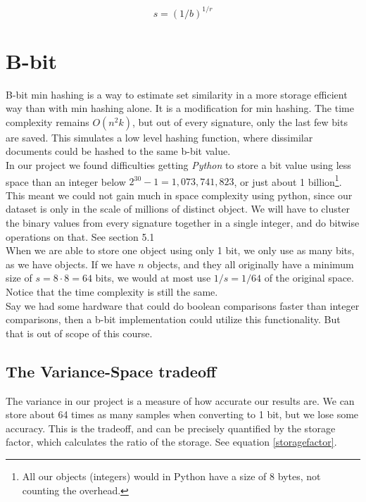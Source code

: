 \documentclass[a4paper,11pt]{article}
\begin{document}
\begin{equation}
    s = (1/b)^{1/r}
    \label{eq:s-estimate}
\end{equation}


\section{B-bit}
B-bit min hashing is a way to estimate set similarity in a more storage efficient way than with min hashing alone. It is a modification for min hashing. The time complexity remains $O(n^2k)$, but out of every signature, only the last few bits are saved. This simulates a low level hashing function, where dissimilar documents could be hashed to the same b-bit value. \\

In our project we found difficulties getting \emph{Python} to store a bit value using less space than an integer below $2^{30}-1 = 1,073,741,823$, or just about 1 billion\footnote{All our objects (integers) would in Python have a size of 8 bytes, not counting the overhead.}. This meant we could not gain much in space complexity using python, since our dataset is only in the scale of millions of distinct object. We will have to cluster the binary values from every signature together in a single integer, and do bitwise operations on that. See \cite{article:bbit} section 5.1  \\

When we are able to store one object using only 1 bit, we only use as many bits, as we have objects. If we have $n$ objects, and they all originally have a minimum size of $s = 8 \cdot 8 = 64$ bits, we would at most use $1/s = 1/64$ of the original space. Notice that the time complexity is still the same. \\

Say we had some hardware that could do boolean comparisons faster than integer comparisons, then a b-bit implementation could utilize this functionality. But that is out of scope of this course. \\

\subsection{The Variance-Space tradeoff}

The variance in our project is a measure of how accurate our results are. We can store about 64 times as many samples when converting to 1 bit, but we lose some accuracy. This is the tradeoff, and can be precisely quantified by the storage factor, which calculates the ratio of the  storage. See equation \ref{storagefactor}.
\end{document}
